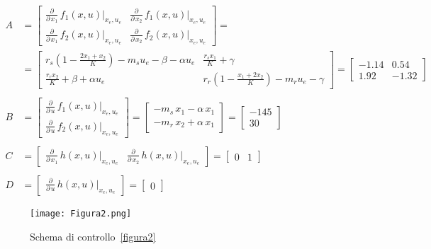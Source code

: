 \documentclass[a4paper, 11pt]{article}
\begin{document}
\begin{subequations}\label{eq:matrices}
\begin{align}
	A &= \begin{bmatrix}
		\frac{\partial}{\partial\,x_1}\,f_1(x,u)\bigg|_{x_e,u_e} & \frac{\partial}{\partial\,x_2}\,f_1(x,u)\bigg|_{x_e,u_e}
		\\
		\frac{\partial}{\partial\,x_1}\,f_2(x,u)\bigg|_{x_e,u_e} & \frac{\partial}{\partial\,x_2}\,f_2(x,u)\bigg|_{x_e,u_e}
	\end{bmatrix} 
	= 
	 \\ &= \begin{bmatrix}
r_s \left(1 - \frac{2x_1 + x_2}{K} \right) - m_s u_e - \beta - \alpha u_e  & \frac{r_s x_1}{K} + \gamma
		\\
\frac{r_r x_2}{K} + \beta + \alpha u_e & r_r \left( 1 - \frac{x_1+2x_2}{K} \right) - m_r u_e - \gamma
\end{bmatrix}
	=
	\begin{bmatrix}
		-1.14 & 0.54
		\\
		1.92 & -1.32
	\end{bmatrix}
	\\ \\ 
	B &= \begin{bmatrix}
		\frac{\partial}{\partial\,u}\,f_1(x,u)\bigg|_{x_e,u_e}
		\\
		\frac{\partial}{\partial\,u}\,f_2(x,u)\bigg|_{x_e,u_e}
	\end{bmatrix}
	=
	\begin{bmatrix}
		-m_s\,x_1-\alpha\,x_1
		\\
		-m_r\,x_2+\alpha\,x_1
	\end{bmatrix}
	=
	\begin{bmatrix}
		-145
		\\
		30
	\end{bmatrix}
	\\ \\
	C &= \begin{bmatrix}
		\frac{\partial}{\partial\,x_1}\,h(x,u)\bigg|_{x_e,u_e} & \frac{\partial}{\partial\,x_2}\,h(x,u)\bigg|_{x_e,u_e}
	\end{bmatrix}
	=\begin{bmatrix}
		0 & 1
	\end{bmatrix}
	\\ \\
	D &= \begin{bmatrix}
		\frac{\partial}{\partial\,u}\,h(x,u)\bigg|_{x_e,u_e}
	\end{bmatrix}
	= \begin{bmatrix}
	0
\end{bmatrix}
\end{align}
\end{subequations}
%
\begin{figure}[h!]
    \centering
    \texttt{[image: Figura2.png]}
    \caption{Schema di controllo~\eqref{figura2}}
    \label{figura2}
\end{figure}
\end{document}
